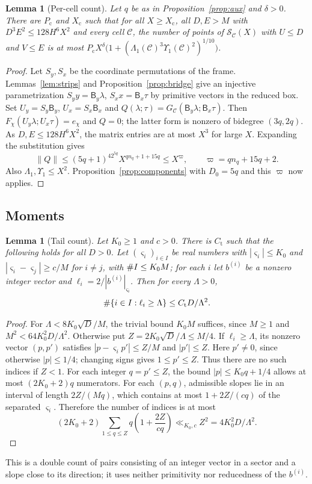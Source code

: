 \documentclass[11pt,reqno]{amsart}
\newtheorem{lemma}[theorem]{Lemma}
\theoremstyle{definition}
\theoremstyle{remark}
\numberwithin{equation}{section}
\begin{document}
\begin{lemma}[Per-cell count]\label{lem:percell}
Let $q$ be as in Proposition~\ref{prop:aux}
and $\delta>0$. There are $P_{\mathrm c}$ and $X_{\mathrm c}$ such that for
all $X\ge X_{\mathrm c}$, all $D,E>M$ with $D^3E^2\le128H^6X^2$ and every
cell $\mathcal C$, the number of points of $\mathcal S_{\mathcal C}(X)$ with
$U\le D$ and $V\le E$ is at most
$P_{\mathrm c}X^{\delta}\bigl(1+(\Lambda_1(\mathcal C)^3\Upsilon_1(\mathcal C)^2)^{1/10}\bigr)$.
\end{lemma}
\begin{proof}
Let $S_y,S_x$ be the coordinate permutations of the frame.
Lemmas~\ref{lem:strips} and Proposition~\ref{prop:bridge} give an
injective parametrization
$S_yy=\mathsf B_y\lambda$, $S_xx=\mathsf B_x\tau$ by primitive
vectors in the reduced box. Set $U_y=S_y\mathsf B_y$,
$U_x=S_x\mathsf B_x$ and
$Q(\lambda;\tau)=G_{\mathcal C}(\mathsf B_y\lambda;\mathsf B_x\tau)$.
Then $F_\chi(U_y\lambda;U_x\tau)=e_\chi$ and $Q=0$; the latter
form is nonzero of bidegree $(3q,2q)$.
As $D,E\le128H^6X^2$, the matrix entries are at most $X^3$ for
large $X$. Expanding the substitution gives
\[
 \|Q\|\le(5q+1)^42^{5q}X^{qn_q+1+15q}\le X^\varpi,
 \qquad \varpi=qn_q+15q+2.
\]
Also $\Lambda_1,\Upsilon_1\le X^2$. Proposition~\ref{prop:components}
with $D_0=5q$ and this $\varpi$ now applies.
\end{proof}

\subsection{Moments}
\begin{lemma}[Tail count]\label{lem:tail}
Let $K_0\ge1$ and $c>0$. There is $C_{\mathrm t}$ such that the following
holds for all $D>0$. Let $(\varsigma_i)_{i\in I}$ be real numbers with
$|\varsigma_i|\le K_0$ and $|\varsigma_i-\varsigma_j|\ge c/M$ for $i\ne j$, with
$\# I\le K_0M$; for each $i$ let $b^{(i)}$ be a nonzero integer vector
and $\ell_i=2/|b^{(i)}|_{\varsigma_i}$. Then for every $\Lambda>0$,
\[
 \#\{i\in I:\ell_i\ge\Lambda\}\le C_{\mathrm t}D/\Lambda^2 .
\]
\end{lemma}
\begin{proof}
For $\Lambda<8K_0\sqrt D/M$, the trivial bound $K_0M$ suffices,
since $M\ge1$ and $M^2<64K_0^2D/\Lambda^2$.
Otherwise put $Z=2K_0\sqrt D/\Lambda\le M/4$.
If $\ell_i\ge\Lambda$, its nonzero vector $(p,p')$ satisfies
$|p-\varsigma_ip'|\le Z/M$ and $|p'|\le Z$.
Here $p'\ne0$, since otherwise $|p|\le1/4$; changing signs gives
$1\le p'\le Z$. Thus there are no such indices if $Z<1$.
For each integer $q=p'\le Z$, the bound
$|p|\le K_0q+1/4$ allows at most $(2K_0+2)q$ numerators.
For each $(p,q)$, admissible slopes lie in an interval of length
$2Z/(Mq)$, which contains at most $1+2Z/(cq)$ of the separated
$\varsigma_i$. Therefore the number of indices is at most
\[
 (2K_0+2)\sum_{1\le q\le Z}q\left(1+\frac{2Z}{cq}\right)
 \ll_{K_0,c}Z^2=4K_0^2D/\Lambda^2.
\]
\end{proof}
This is a double count of pairs consisting of an integer vector in a sector
and a slope close to its direction; it uses neither primitivity nor
reducedness of the $b^{(i)}$.
\end{document}
